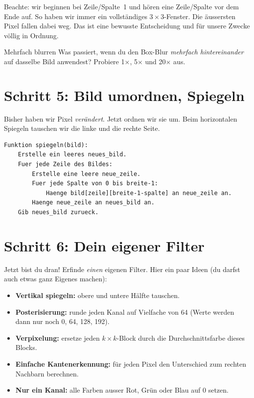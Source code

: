 Beachte: wir beginnen bei Zeile/Spalte~1 und h\"oren eine Zeile/Spalte vor
dem Ende auf. So haben wir immer ein vollst\"andiges $3\times 3$-Fenster.
Die \"aussersten Pixel fallen dabei weg. Das ist eine bewusste Entscheidung
und f\"ur unsere Zwecke v\"ollig in Ordnung.


\begin{aufgabe}{Mehrfach blurren}
Was passiert, wenn du den Box-Blur \textit{mehrfach hintereinander} auf
dasselbe Bild anwendest? Probiere 1$\times$, 5$\times$ und 20$\times$ aus.
\end{aufgabe}

\section{Schritt 5: Bild umordnen, Spiegeln}

Bisher haben wir Pixel \textit{ver\"andert}. Jetzt ordnen wir sie um. Beim
horizontalen Spiegeln tauschen wir die linke und die rechte Seite.

\begin{lstlisting}[style=pseudo]
Funktion spiegeln(bild):
    Erstelle ein leeres neues_bild.
    Fuer jede Zeile des Bildes:
        Erstelle eine leere neue_zeile.
        Fuer jede Spalte von 0 bis breite-1:
            Haenge bild[zeile][breite-1-spalte] an neue_zeile an.
        Haenge neue_zeile an neues_bild an.
    Gib neues_bild zurueck.
\end{lstlisting}


\section{Schritt 6: Dein eigener Filter}

Jetzt bist du dran! Erfinde \textit{einen} eigenen Filter. Hier ein paar
Ideen (du darfst auch etwas ganz Eigenes machen):

\begin{itemize}
  \item \textbf{Vertikal spiegeln:} obere und untere H\"alfte tauschen.
  \item \textbf{Posterisierung:} runde jeden Kanal auf Vielfache von 64
    (Werte werden dann nur noch 0, 64, 128, 192).
  \item \textbf{Verpixelung:} ersetze jeden $k \times k$-Block durch
    die Durchschnittsfarbe dieses Blocks.
  \item \textbf{Einfache Kantenerkennung:} f\"ur jeden Pixel den Unterschied
    zum rechten Nachbarn berechnen.
  \item \textbf{Nur ein Kanal:} alle Farben ausser Rot, Gr\"un oder Blau
    auf 0 setzen.
\end{itemize}

